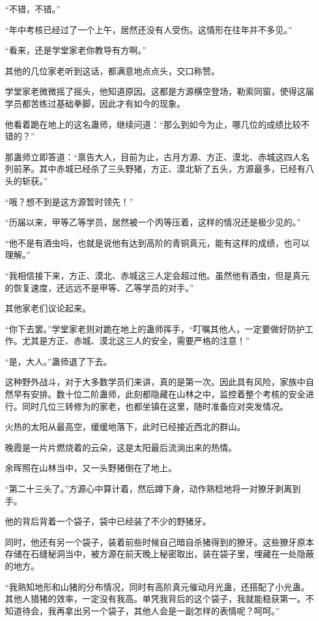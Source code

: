\begin{this_body}
“不错，不错。”

“年中考核已经过了一个上午，居然还没有人受伤。这情形在往年并不多见。”

“看来，还是学堂家老你教导有方啊。”

其他的几位家老听到这话，都满意地点点头，交口称赞。

学堂家老微微摇了摇头，他知道原因。这都是方源横空登场，勒索同窗，使得这届学员都苦练过基础拳脚，因此才有如今的现象。

他看着跪在地上的这名蛊师，继续问道：“那么到如今为止，哪几位的成绩比较不错的？”

那蛊师立即答道：“禀告大人，目前为止，古月方源、方正、漠北、赤城这四人名列前茅。其中赤城已经杀了三头野猪，方正、漠北斩了五头，方源最多，已经有八头的斩获。”

“哦？想不到是这方源暂时领先！”

“历届以来，甲等乙等学员，居然被一个丙等压着，这样的情况还是极少见的。”

“他不是有酒虫吗，也就是说他有达到高阶的青铜真元，能有这样的成绩，也可以理解。”

“我相信接下来，方正、漠北、赤城这三人定会超过他。虽然他有酒虫，但是真元的恢复速度，还远远不是甲等、乙等学员的对手。”

其他家老们议论起来。

“你下去罢。”学堂家老则对跪在地上的蛊师挥手，“叮嘱其他人，一定要做好防护工作。尤其是方正、赤城、漠北这三人的安全，需要严格的注意！”

“是，大人。”蛊师退了下去。

这种野外战斗，对于大多数学员们来讲，真的是第一次。因此具有风险，家族中自然早有安排。数十位二阶蛊师，此刻都隐藏在山林之中，监控着整个考核的安全进行。同时几位三转修为的家老，也都坐镇在这里，随时准备应对突发情况。

火热的太阳从最高空，缓缓地落下，此时已经接近西北的群山。

晚霞是一片片燃烧着的云朵，这是太阳最后流淌出来的热情。

余晖照在山林当中，又一头野猪倒在了地上。

“第二十三头了。”方源心中算计着，然后蹲下身，动作熟稔地将一对獠牙剥离到手。

他的背后背着一个袋子，袋中已经装了不少的野猪牙。

同时，他还有另一个袋子，装着前些时候自己暗自杀猪得到的獠牙。这些獠牙原本存储在石缝秘洞当中，被方源在前天晚上秘密取出，装在袋子里，埋藏在一处隐蔽的地方。

“我熟知地形和山猪的分布情况，同时有高阶真元催动月光蛊，还搭配了小光蛊。其他人猎猪的效率，一定没有我高。单凭我背后的这个袋子，我就能稳获第一。不知道待会，我再拿出另一个袋子，其他人会是一副怎样的表情呢？呵呵。”


\end{this_body}
